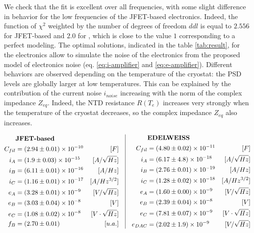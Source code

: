 We check that the fit is excellent over all frequencies, with some slight difference in behavior for the low frequencies of the JFET-based electronics. Indeed, the function of $\chi^2$ weighted by the number of degrees of freedom $ddl$ is equal to $2.556$ for JFET-based and $2.0$ for \Edelweiss{}, which is close to the value $1$ corresponding to a perfect modeling. The optimal solutions, indicated in the table \ref{tab:result}, for the electronics allow to simulate the noise of the electronics from the proposed model of electronics noise (eq. \ref{eq:i-amplifier} and \ref{eq:e-amplifier}). Different behaviors are observed depending on the temperature of the cryostat: the PSD levels are globally larger at low temperatures. This can be explained by the contribution of the current noise $i_{noise}$ increasing with the norm of the complex impedance $Z_{eq}$. Indeed, the NTD resistance $R(T_e)$ increases very strongly when the temperature of the cryostat decreases, so the complex impedance $Z_{eq}$ also increases.

\begin{align}
\label{tab:result}
\begin{aligned}[c]
& \textrm{\textbf{JFET-based}} \\
C_{fil} &= (2.94 \pm 0.01)\times 10^{-10}&[F] \\
i_A &= (1.9 \pm 0.03) \times 10^{-15}&[A/\sqrt{Hz}] \\
i_B &= (6.11 \pm 0.01) \times 10^{-16}&[A/Hz] \\
i_C &= (1.16 \pm 0.01) \times 10^{-17}&[A/Hz^{3/2}] \\
e_A &= (3.28 \pm 0.01) \times 10^{-9} &[V/\sqrt{Hz}] \\
e_B &= (3.03 \pm 0.04) \times 10^{-8}&[V] \\
e_C &= (1.08 \pm 0.02) \times 10^{-8} &[V \cdot \sqrt{Hz}] \\
f_B &= (2.70 \pm 0.01) & [u.a.]
\end{aligned}
\quad \vrule{} \quad
\begin{aligned}[c]
& \textrm{\textbf{EDELWEISS}} \\
C_{fil} &= (4.80 \pm 0.02)\times 10^{-11}&[F] \\
i_A &= (6.17 \pm 4.8) \times 10^{-18}&[A/\sqrt{Hz}] \\
i_B &= (2.76 \pm 0.01) \times 10^{-19}&[A/Hz] \\
i_C &= (1.28 \pm 0.02) \times 10^{-18}&[A/Hz^{3/2}] \\
e_A &= (1.60 \pm 0.00) \times 10^{-9} &[V/\sqrt{Hz}] \\
e_B &= (2.39 \pm 0.04) \times 10^{-8}&[V] \\
e_C &= (7.81 \pm 0.07) \times 10^{-9} &[V \cdot \sqrt{Hz}] \\
e_{DAC} &= (2.02 \pm 1.9) \times 10^{-9}&[V/\sqrt{Hz}] 
\end{aligned}
\end{align}

